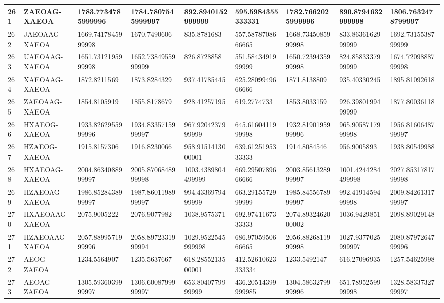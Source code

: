 {\begin{longtable}{|l|l|l|l|l|l|l|l|l|}
        261 & ZAEOAG-XAEOA & 1783.7734785999996 & 1784.7807545999997 & 892.8940152999999 & 595.5984355333331 & 1782.7662025999996 & 890.8794632999998 & 1806.7632478799997 \\ \hline
        262 & JAEOAAG-XAEOA & 1669.7417845999998 & 1670.7490606 & 835.8781683 & 557.5878708666665 & 1668.7345085999998 & 833.8636162999999 & 1692.7315538799999 \\ \hline
        263 & UAEOAAG-XAEOA & 1651.7312195999998 & 1652.7384955999999 & 826.8728858 & 551.5843491999999 & 1650.7239435999998 & 824.8583337999999 & 1674.7209888799998 \\ \hline
        264 & XAEOAAG-XAEOA & 1872.8211569 & 1873.8284329 & 937.41785445 & 625.2809949666666 & 1871.8138809 & 935.40330245 & 1895.81092618 \\ \hline
        265 & ZAEOAAG-XAEOA & 1854.8105919 & 1855.8178679 & 928.41257195 & 619.2774733 & 1853.8033159 & 926.3980199499999 & 1877.80036118 \\ \hline
        266 & HXAEOG-XAEOA & 1933.8262955999996 & 1934.8335715999997 & 967.9204237999999 & 645.6160411999998 & 1932.8190195999996 & 965.9058717999998 & 1956.8160648799997 \\ \hline
        267 & HZAEOG-XAEOA & 1915.8157306 & 1916.8230066 & 958.9151413000001 & 639.6125195333333 & 1914.8084546 & 956.9005893 & 1938.80549988 \\ \hline
        268 & HXAEOAG-XAEOA & 2004.8634088999997 & 2005.8706848999998 & 1003.4389804499999 & 669.2950789666666 & 2003.8561328999997 & 1001.4244284499998 & 2027.8531781799998 \\ \hline
        269 & HZAEOAG-XAEOA & 1986.8528438999997 & 1987.8601198999997 & 994.4336979499999 & 663.2915572999999 & 1985.8455678999997 & 992.4191459499998 & 2009.8426131799997 \\ \hline
        270 & HXAEOAAG-XAEOA & 2075.9005222 & 2076.9077982 & 1038.9575371 & 692.9741167333333 & 2074.8932462000002 & 1036.9429851 & 2098.89029148 \\ \hline
        271 & HZAEOAAG-XAEOA & 2057.8899571999996 & 2058.8972331999994 & 1029.9522545999998 & 686.9705950666665 & 2056.8826811999998 & 1027.9377025999997 & 2080.8797264799996 \\ \hline
        272 & AEOG-ZAEOA & 1234.5564907 & 1235.5637667 & 618.2855213500001 & 412.52610623333334 & 1233.5492147 & 616.27096935 & 1257.54625998 \\ \hline
        273 & AEOAG-ZAEOA & 1305.5936039999997 & 1306.6008799999997 & 653.8040779999999 & 436.20514399999985 & 1304.5863279999996 & 651.7895259999998 & 1328.5833732799997 \\ \hline

\end{longtable}}
